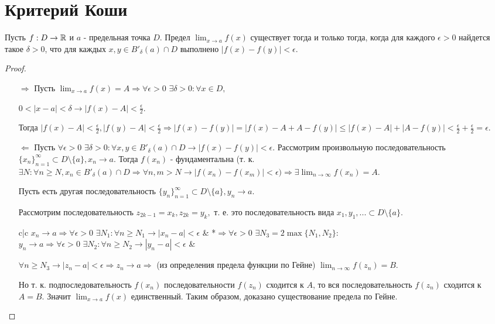 	\section{Критерий Коши}
	
	\begin{theorem}
		Пусть $f : D \rightarrow \mathbb R$ и $a$ - предельная точка $D$. Предел $\lim_{x \to a} f(x)$ существует тогда и только тогда, когда для каждого $\epsilon > 0$ найдется такое $\delta > 0$, что для каждых $x, y \in B'_{\delta}(a) \cap D$ выполнено $|f(x) - f(y)| < \epsilon$.
	\end{theorem}
	
	\begin{proof}
		\begin{itemize}
			\item[$\Rightarrow$] Пусть $\lim_{x \to a} f(x) = A \Rightarrow \forall \epsilon > 0$ $\exists \delta > 0: \forall x \in D,$
			
			$0 < |x - a| < \delta \rightarrow |f(x) - A| < \frac{\epsilon}{2}.$
			
			Тогда $|f(x) - A| < \frac{\epsilon}{2}, |f(y) - A| < \frac{\epsilon}{2} \Rightarrow |f(x) - f(y)| = |f(x) - A + A - f(y)| \leqslant |f(x) - A| + |A - f(y)| < \frac{\epsilon}{2} + \frac{\epsilon}{2} = \epsilon.$
			\item[$\Leftarrow$] Пусть $\forall \epsilon > 0$ $\exists \delta > 0: \forall x, y \in B'_{\delta}(a) \cap D \rightarrow |f(x) - f(y)| < \epsilon.$ Рассмотрим произвольную последовательность $\{x_n\}^{\infty}_{n = 1} \subset D \setminus  \{a\}, x_n \to a.$ Тогда $f(x_n)$ - фундаментальна (т. к. $\exists N: \forall n \geqslant N, x_n \in B'_{\delta}(a) \cap D \Rightarrow \forall n, m > N \rightarrow |f(x_n) - f(x_m)| < \epsilon) \Rightarrow\exists \lim_{n \to \infty} f(x_n) = A.$
			
			Пусть есть другая последовательность $\{y_n\}^{\infty}_{n = 1} \subset D \setminus \{a\}, y_n \to a.$
			
			Рассмотрим последовательность $z_{2k - 1} = x_k, z_{2k} = y_k,$ т. е. это последовательность вида $x_1, y_1, ... \subset D \setminus \{a\}.$
			
			\begin{tabular}{c|c}
				$x_n \to a \Rightarrow \forall \epsilon > 0$ $\exists N_1: \forall n \geqslant N_1 \rightarrow |x_n - a| < \epsilon$ & *{$\Rightarrow \forall \epsilon > 0$ $\exists N_3 = 2\max\{N_1, N_2\}:$} \\
				$y_n \to a \Rightarrow \forall \epsilon > 0$ $\exists N_2: \forall n \geqslant N_2 \rightarrow |y_n - a| < \epsilon$ &                  
			\end{tabular}
			$\forall n \geqslant N_3 \rightarrow |z_n - a| < \epsilon \Rightarrow z_n \to a \Rightarrow$ (из определения предела функции по Гейне) $\lim_{n \to \infty} f(z_n) = B.$
			
			Но т. к. подпоследовательность $f(x_n)$ последовательности $f(z_n)$ сходится к $A$, то вся последовательность $f(z_n)$ сходится к $A = B.$ Значит $\lim_{x \to a} f(x)$ единственный. Таким образом, доказано существование предела по Гейне.
		\end{itemize}
	\end{proof}
	
